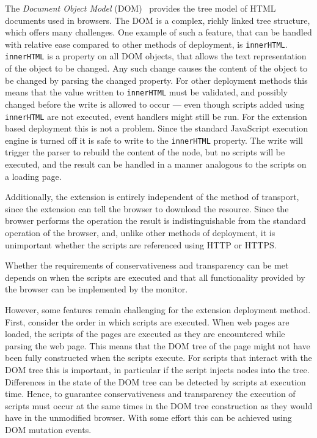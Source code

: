 \documentclass{llncs}
\begin{document}
The \emph{Document Object Model} (DOM)~\cite{DOM2} provides the tree model of HTML
documents used in browsers. The DOM is a complex, richly linked tree structure,
which offers many challenges.  One example of such a feature, that can be
handled with relative ease compared to other methods of deployment, is
\lstinline{innerHTML}. \lstinline{innerHTML} is a property on all DOM objects,
that allows the text representation of the object to be changed. Any such
change causes the content of the object to be changed by parsing the changed
property. For other deployment methods this means that the value written to
\lstinline{innerHTML} must be validated, and possibly changed before the write
is allowed to occur --- even though scripts added using \lstinline{innerHTML}
are not executed, event handlers might still be run.
%
For the extension based deployment this is not a problem.  Since the standard
JavaScript execution engine is turned off it is safe to write to the
\lstinline{innerHTML} property. The write will trigger the parser to rebuild
the content of the node, but no scripts will be executed, and the result can be
handled in a manner analogous to the scripts on a loading page.

Additionally, the extension is entirely independent of the method of transport,
since the extension can tell the browser to download the resource. Since the 
browser performs the operation the result
is indistinguishable from the standard operation of the browser, and, unlike other 
methods of deployment, it is unimportant whether the scripts
are referenced using HTTP or HTTPS.

Whether the requirements of conservativeness and transparency can be met
depends on when the scripts are executed and that all functionality provided by
the browser can be implemented by the monitor.

However, some features remain challenging for the extension deployment method.
First, consider the order in which scripts are executed.  When web pages are
loaded, the scripts of the pages are executed as they are encountered while
parsing the web page. This means that the DOM tree of the page might not have
been fully constructed when the scripts execute.  For scripts that interact
with the DOM tree this is important, in particular if the script injects nodes
into the tree. Differences in the state of the DOM tree can be detected by 
scripts at execution time. Hence, to guarantee conservativeness and transparency 
the execution of scripts must occur at the same times in the DOM tree construction
as they would have in the unmodified browser. With some effort this can be achieved
using DOM mutation events.
\end{document}

